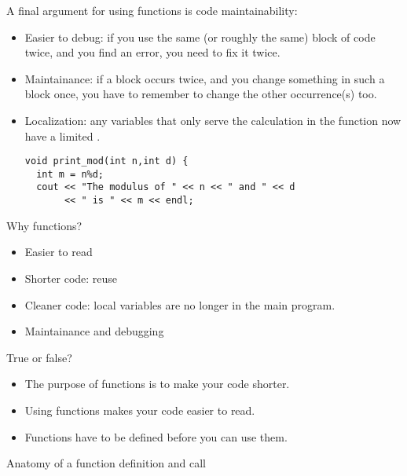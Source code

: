 A final argument for using functions is code maintainability:
\begin{itemize}
\item Easier to debug: if you use the same (or roughly the same) block
  of code twice, and you find an error, you need to fix it twice.
\item Maintainance: if a block occurs twice, and  you change something in such a block
  once, you have to remember to change the other occurrence(s) too.
\item Localization: any variables that only serve the calculation in
  the function now have a limited .
\begin{verbatim}
void print_mod(int n,int d) {
  int m = n%d;
  cout << "The modulus of " << n << " and " << d 
       << " is " << m << endl;
\end{verbatim}
\end{itemize}

\begin{slide}{Why functions?}
  \label{sl:func-why}
  \begin{itemize}
  \item Easier to read
  \item Shorter code: reuse
  \item Cleaner code: local variables are no longer in the main program.
  \item Maintainance and debugging
  \end{itemize}
\end{slide}

\begin{review}
  \label{rev:func-why}
  True or false?
  \begin{itemize}
  \item The purpose of functions is to make your code shorter.
  \item Using functions makes your code easier to read.
  \item Functions have to be defined before you can use them.
  \end{itemize}
\end{review}

 {Anatomy of a function definition and call}

